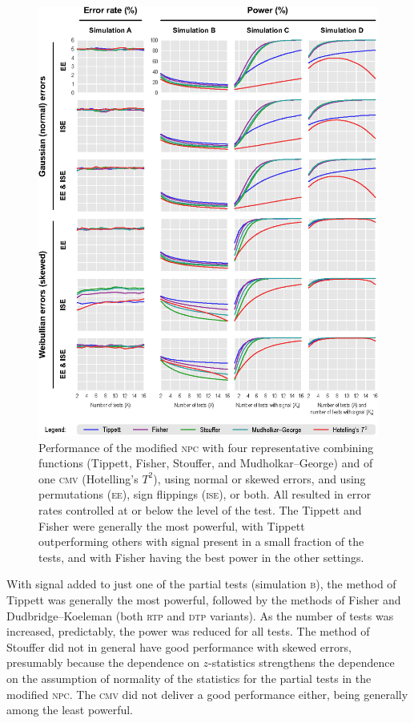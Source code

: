 \begin{figure}[p]
\begin{center}
\centerline{\includegraphics{images/performance.eps}}
\end{center}
\vspace{-3mm}
\caption[Performance of the modified \textsc{npc} using different combining functions, compared to Hotelling's $T^2$.]{Performance of the modified \textsc{npc} with four representative combining functions (Tippett, Fisher, Stouffer, and Mudholkar--George) and of one \textsc{cmv} (Hotelling's $T^2$), using normal or skewed errors, and using permutations (\textsc{ee}), sign flippings (\textsc{ise}), or both. All resulted in error rates controlled at or below the level of the test. The Tippett and Fisher were generally the most powerful, with Tippett outperforming others with signal present in a small fraction of the tests, and with Fisher having the best power in the other settings.}
\label{fig:performance}
\end{figure}

With signal added to just one of the partial tests (simulation \textsc{b}), the method of Tippett was generally the most powerful, followed by the methods of Fisher and Dudbridge--Koeleman (both \textsc{rtp} and \textsc{dtp} variants). As the number of tests was increased, predictably, the power was reduced for all tests. The method of Stouffer did not in general have good performance with skewed errors, presumably because the dependence on $z$-statistics strengthens the dependence on the assumption of normality of the statistics for the partial tests in the modified \textsc{npc}. The \textsc{cmv} did not deliver a good performance either, being generally among the least powerful.

